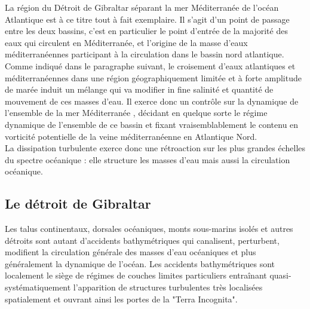 La région du Détroit de Gibraltar séparant la mer Méditerranée de l'océan Atlantique est à ce titre tout à fait exemplaire. Il s'agit d'un point de passage entre les deux bassins, c'est en particulier le point d'entrée de la majorité des eaux qui circulent en Méditerranée, et l'origine de la masse d'eaux méditerranéennes participant à la circulation dans le bassin nord atlantique. Comme indiqué dans le paragraphe suivant, le croisement d'eaux atlantiques et méditerranéennes dans une région géographiquement limitée et à forte amplitude de marée induit un mélange qui va modifier in fine salinité et quantité de mouvement de ces masses d'eau. Il exerce donc un contrôle sur la dynamique de l'ensemble de la mer Méditerranée \citep{FA1988}, décidant en quelque sorte le régime dynamique de l'ensemble de ce bassin et fixant vraisemblablement le contenu en vorticité potentielle de la veine méditerranéenne en Atlantique Nord.\\


La dissipation turbulente exerce donc une rétroaction sur les plus grandes échelles du spectre océanique : elle  structure les masses d'eau mais aussi la circulation océanique.
\color{black}


\subsection{Le détroit de Gibraltar}

Les talus continentaux, dorsales océaniques, monts sous-marins isolés et autres détroits sont autant d'accidents bathymétriques qui canalisent, perturbent, modifient la circulation générale des masses d'eau océaniques et plus généralement la dynamique de l'océan. Les accidents bathymétriques sont localement le siège de régimes de couches limites particuliers entraînant quasi-systématiquement l'apparition de structures turbulentes très localisées spatialement et ouvrant ainsi les portes de la "Terra Incognita".

